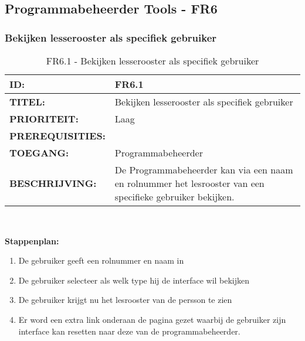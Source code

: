 \subsection{Programmabeheerder Tools - FR6}

\subsubsection{Bekijken lesserooster als specifiek gebruiker}
\noindent\begin{table}[H]
            \begin{tabular}{l | p{10cm}}
                \textbf{ID:} & FR6.1 \\ \hline
                \textbf{TITEL:} & Bekijken lesserooster als specifiek gebruiker\\ \hline
                \textbf{PRIORITEIT:} &  Laag \\ \hline
                \textbf{PREREQUISITIES:} & \\ \hline
                \textbf{TOEGANG:} & Programmabeheerder \\ \hline
                \textbf{BESCHRIJVING:} & De Programmabeheerder kan via een naam en rolnummer het lesrooster van een specifieke gebruiker bekijken. \\ 
            \end{tabular}\\
            \caption{FR6.1 - Bekijken lesserooster als specifiek gebruiker}
            \label{tab:FR6.1 - Bekijken lesserooster als specifiek gebruiker}
        \end{table}
        
\textbf{Stappenplan:}
	\begin{enumerate}
	\item De gebruiker geeft een rolnummer en naam in
	\item De gebruiker selecteer als welk type hij de interface wil bekijken
	\item De gebruiker krijgt nu het lesrooster van de persson te zien
	\item Er word een extra link onderaan de pagina gezet waarbij de gebruiker zijn interface kan resetten naar deze van de programmabeheerder.
	\end{enumerate}
        
